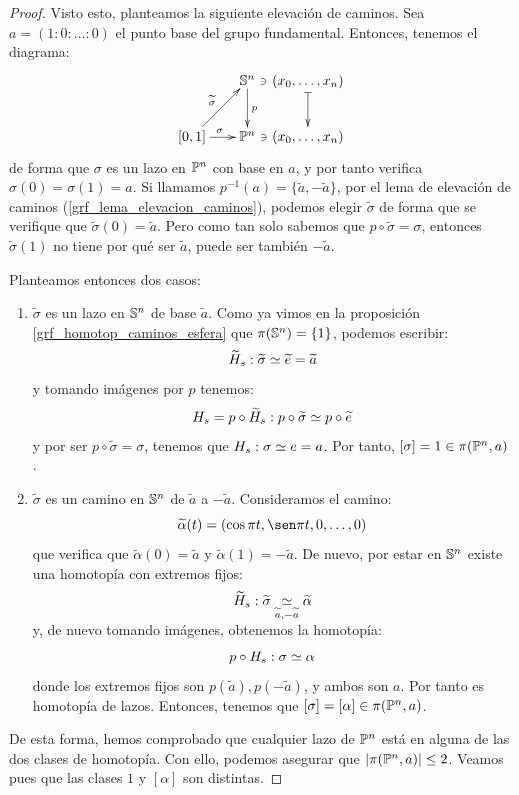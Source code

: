 \begin{theo}
\begin{proof}
		Visto esto, planteamos la siguiente elevación de caminos. Sea $a=(1:0:\dotsc:0)$ el punto base del grupo fundamental. Entonces, tenemos el diagrama:
		\[\xymatrix @C = 0.5pc {
			&& \Sfe^n \ar[d]^p & (x_0,\dots,x_n) \ar@{|->}[d] \ar@{}[l]|-\ni \\
			[0,1] \ar[rr]^\sigma \ar[rru]^{\widetilde{\sigma}} && \proy^n & (x_0,\dotsc,x_n) \ar@{}[l]|-\ni
		}\]
		de forma que $\sigma$ es un lazo en $\proy^n$ con base en $a$, y por tanto verifica $\sigma(0)=\sigma(1)=a$. Si llamamos $p^{-1}(a)=\{\widetilde{a},-\widetilde{a}\}$, por el lema de elevación de caminos (\ref{grf_lema_elevacion_caminos}), podemos elegir $\widetilde{\sigma}$ de forma que se verifique que $\widetilde{\sigma}(0)=\widetilde{a}$. Pero como tan solo sabemos que $p\circ\widetilde{\sigma}=\sigma$, entonces $\widetilde{\sigma}(1)$ no tiene por qué ser $\widetilde{a}$, puede ser también $-\widetilde{a}$.
		
		Planteamos entonces dos casos:
		\begin{enumerate}[label=\roman*)]
			\item $\widetilde{\sigma}$ es un lazo en $\Sfe^n$ de base $\widetilde{a}$. Como ya vimos en la proposición \ref{grf_homotop_caminos_esfera} que $\pi(\Sfe^n)=\{1\}$, podemos escribir:
			\[\widetilde{H}_s:\widetilde{\sigma}\homot\widetilde{e}=\widetilde{a}\]
			y tomando imágenes por $p$ tenemos:
			\[H_s=p\circ\widetilde{H}_s:p\circ\widetilde{\sigma}\homot p\circ\widetilde{e}\]
			y por ser $p\circ\widetilde{\sigma}=\sigma$, tenemos que $H_s: \sigma\homot e=a$. Por tanto, $[\sigma] = 1\in\pi(\proy^n,a)$.
			
			\item $\widetilde{\sigma}$ es un camino en $\Sfe^n$ de $\widetilde{a}$ a $-\widetilde{a}$. Consideramos el camino:
			\[\widetilde{\alpha}(t)= (\cos\pi t, \sen\pi t,0,\dots, 0) \]
			que verifica que $\widetilde{\alpha}(0)=\widetilde{a}$ y $\widetilde{\alpha}(1)=-\widetilde{a}$. De nuevo, por estar en $\Sfe^n$ existe una homotopía con extremos fijos:
			\[\widetilde{H}_s:\widetilde{\sigma}\homot[\widetilde{a},-\widetilde{a}]\widetilde{\alpha}\]
			y, de nuevo tomando imágenes, obtenemos la homotopía:
			\[p\circ H_s:\sigma\homot\alpha\]
			donde los extremos fijos son $p(\widetilde{a}),p(-\widetilde{a})$, y ambos son $a$. Por tanto es homotopía de lazos. Entonces, tenemos que $[\sigma] = [\alpha]\in\pi(\proy^n,a)$.
		\end{enumerate}
		
		De esta forma, hemos comprobado que cualquier lazo de $\proy^n$ está en alguna de las dos clases de homotopía. Con ello, podemos asegurar que $\card{\pi(\proy^n,a)}\leq 2$. Veamos pues que las clases $1$ y $[\alpha]$ son distintas.
		

\end{proof}
\end{theo}
